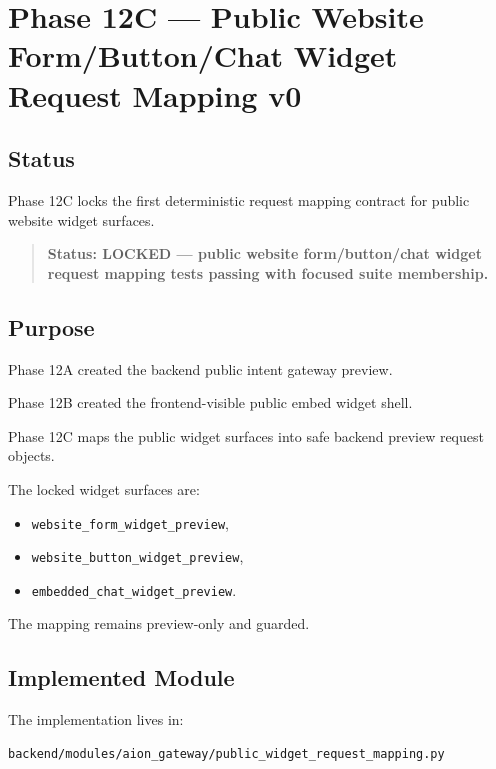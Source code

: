\section{Phase 12C --- Public Website Form/Button/Chat Widget Request Mapping v0}
\label{sec:aion-public-widget-request-mapping-v0}

\subsection{Status}

Phase 12C locks the first deterministic request mapping contract for public website widget surfaces.

\begin{quote}
\textbf{Status: LOCKED --- public website form/button/chat widget request mapping tests passing with focused suite membership.}
\end{quote}

\subsection{Purpose}

Phase 12A created the backend public intent gateway preview.

Phase 12B created the frontend-visible public embed widget shell.

Phase 12C maps the public widget surfaces into safe backend preview request objects.

The locked widget surfaces are:

\begin{itemize}
  \item \texttt{website\_form\_widget\_preview},
  \item \texttt{website\_button\_widget\_preview},
  \item \texttt{embedded\_chat\_widget\_preview}.
\end{itemize}

The mapping remains preview-only and guarded.

\subsection{Implemented Module}

The implementation lives in:

\begin{verbatim}
backend/modules/aion_gateway/public_widget_request_mapping.py
\end{verbatim}

